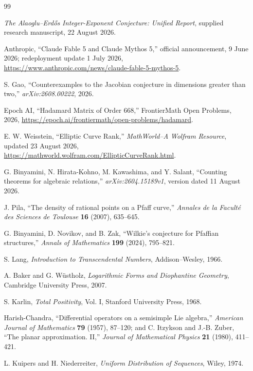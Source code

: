 \documentclass[10pt,oneside]{article}
\theoremstyle{definition}
\theoremstyle{remark}
\begin{document}
\begin{thebibliography}{99}

\emph{The Alaoglu--Erd\H{o}s Integer-Exponent Conjecture: Unified Report},
supplied research manuscript, 22 August 2026.

Anthropic,
``Claude Fable 5 and Claude Mythos 5,'' official announcement, 9 June 2026; redeployment update 1 July 2026,
\url{https://www.anthropic.com/news/claude-fable-5-mythos-5}.

S. Gao,
``Counterexamples to the Jacobian conjecture in dimensions greater than two,''
\emph{arXiv:2608.00222}, 2026.

Epoch AI,
``Hadamard Matrix of Order 668,'' FrontierMath Open Problems, 2026,
\url{https://epoch.ai/frontiermath/open-problems/hadamard}.

E. W. Weisstein,
``Elliptic Curve Rank,'' \emph{MathWorld--A Wolfram Resource}, updated 23 August 2026,
\url{https://mathworld.wolfram.com/EllipticCurveRank.html}.

G. Binyamini, N. Hirata-Kohno, M. Kawashima, and Y. Salant,
``Counting theorems for algebraic relations,''
\emph{arXiv:2604.15189v1}, version dated 11 August 2026.

J. Pila,
``The density of rational points on a Pfaff curve,''
\emph{Annales de la Facult\'e des Sciences de Toulouse} \textbf{16} (2007), 635--645.

G. Binyamini, D. Novikov, and B. Zak,
``Wilkie's conjecture for Pfaffian structures,''
\emph{Annals of Mathematics} \textbf{199} (2024), 795--821.

S. Lang,
\emph{Introduction to Transcendental Numbers},
Addison--Wesley, 1966.

A. Baker and G. W\"ustholz,
\emph{Logarithmic Forms and Diophantine Geometry},
Cambridge University Press, 2007.

S. Karlin,
\emph{Total Positivity}, Vol. I,
Stanford University Press, 1968.

Harish-Chandra,
``Differential operators on a semisimple Lie algebra,''
\emph{American Journal of Mathematics} \textbf{79} (1957), 87--120;
and C. Itzykson and J.-B. Zuber,
``The planar approximation. II,''
\emph{Journal of Mathematical Physics} \textbf{21} (1980), 411--421.

L. Kuipers and H. Niederreiter,
\emph{Uniform Distribution of Sequences},
Wiley, 1974.

\end{thebibliography}
\end{document}
